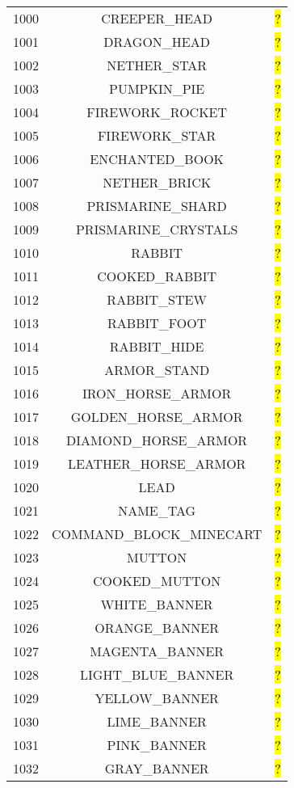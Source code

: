\documentclass[11pt]{article}
\newcommand\myworries[1]{\sethlcolor{red}\hl{#1}}
\begin{document}
\begin{longtable}{ |c|c|c| }
1000 & CREEPER\_HEAD & \myworries{?} \\
1001 & DRAGON\_HEAD & \myworries{?} \\
1002 & NETHER\_STAR & \myworries{?} \\
1003 & PUMPKIN\_PIE & \myworries{?} \\
1004 & FIREWORK\_ROCKET & \myworries{?} \\
1005 & FIREWORK\_STAR & \myworries{?} \\
1006 & ENCHANTED\_BOOK & \myworries{?} \\
1007 & NETHER\_BRICK & \myworries{?} \\
1008 & PRISMARINE\_SHARD & \myworries{?} \\
1009 & PRISMARINE\_CRYSTALS & \myworries{?} \\
1010 & RABBIT & \myworries{?} \\
1011 & COOKED\_RABBIT & \myworries{?} \\
1012 & RABBIT\_STEW & \myworries{?} \\
1013 & RABBIT\_FOOT & \myworries{?} \\
1014 & RABBIT\_HIDE & \myworries{?} \\
1015 & ARMOR\_STAND & \myworries{?} \\
1016 & IRON\_HORSE\_ARMOR & \myworries{?} \\
1017 & GOLDEN\_HORSE\_ARMOR & \myworries{?} \\
1018 & DIAMOND\_HORSE\_ARMOR & \myworries{?} \\
1019 & LEATHER\_HORSE\_ARMOR & \myworries{?} \\
1020 & LEAD & \myworries{?} \\
1021 & NAME\_TAG & \myworries{?} \\
1022 & COMMAND\_BLOCK\_MINECART & \myworries{?} \\
1023 & MUTTON & \myworries{?} \\
1024 & COOKED\_MUTTON & \myworries{?} \\
1025 & WHITE\_BANNER & \myworries{?} \\
1026 & ORANGE\_BANNER & \myworries{?} \\
1027 & MAGENTA\_BANNER & \myworries{?} \\
1028 & LIGHT\_BLUE\_BANNER & \myworries{?} \\
1029 & YELLOW\_BANNER & \myworries{?} \\
1030 & LIME\_BANNER & \myworries{?} \\
1031 & PINK\_BANNER & \myworries{?} \\
1032 & GRAY\_BANNER & \myworries{?} \\

\end{longtable}
\end{document}
